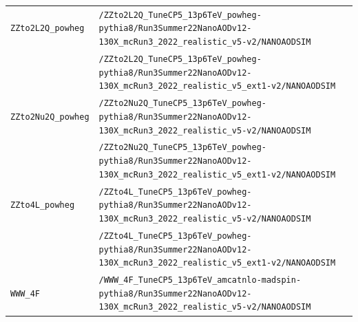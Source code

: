 \begin{longtable}{@{}>{\RaggedRight\arraybackslash}p{} >{\RaggedRight\arraybackslash}p{}@{}}
\addlinespace[2pt]
\texttt{ZZto2L2Q\_\allowbreak{}powheg} & \texttt{/\allowbreak{}ZZto2L2Q\_\allowbreak{}TuneCP5\_\allowbreak{}13p6TeV\_\allowbreak{}powheg-\allowbreak{}pythia8/\allowbreak{}Run3Summer22NanoAODv12-\allowbreak{}130X\_\allowbreak{}mcRun3\_\allowbreak{}2022\_\allowbreak{}realistic\_\allowbreak{}v5-\allowbreak{}v2/\allowbreak{}NANOAODSIM} \\
 & \texttt{/\allowbreak{}ZZto2L2Q\_\allowbreak{}TuneCP5\_\allowbreak{}13p6TeV\_\allowbreak{}powheg-\allowbreak{}pythia8/\allowbreak{}Run3Summer22NanoAODv12-\allowbreak{}130X\_\allowbreak{}mcRun3\_\allowbreak{}2022\_\allowbreak{}realistic\_\allowbreak{}v5\_\allowbreak{}ext1-\allowbreak{}v2/\allowbreak{}NANOAODSIM} \\
\addlinespace[2pt]
\texttt{ZZto2Nu2Q\_\allowbreak{}powheg} & \texttt{/\allowbreak{}ZZto2Nu2Q\_\allowbreak{}TuneCP5\_\allowbreak{}13p6TeV\_\allowbreak{}powheg-\allowbreak{}pythia8/\allowbreak{}Run3Summer22NanoAODv12-\allowbreak{}130X\_\allowbreak{}mcRun3\_\allowbreak{}2022\_\allowbreak{}realistic\_\allowbreak{}v5-\allowbreak{}v2/\allowbreak{}NANOAODSIM} \\
 & \texttt{/\allowbreak{}ZZto2Nu2Q\_\allowbreak{}TuneCP5\_\allowbreak{}13p6TeV\_\allowbreak{}powheg-\allowbreak{}pythia8/\allowbreak{}Run3Summer22NanoAODv12-\allowbreak{}130X\_\allowbreak{}mcRun3\_\allowbreak{}2022\_\allowbreak{}realistic\_\allowbreak{}v5\_\allowbreak{}ext1-\allowbreak{}v2/\allowbreak{}NANOAODSIM} \\
\addlinespace[2pt]
\texttt{ZZto4L\_\allowbreak{}powheg} & \texttt{/\allowbreak{}ZZto4L\_\allowbreak{}TuneCP5\_\allowbreak{}13p6TeV\_\allowbreak{}powheg-\allowbreak{}pythia8/\allowbreak{}Run3Summer22NanoAODv12-\allowbreak{}130X\_\allowbreak{}mcRun3\_\allowbreak{}2022\_\allowbreak{}realistic\_\allowbreak{}v5-\allowbreak{}v2/\allowbreak{}NANOAODSIM} \\
 & \texttt{/\allowbreak{}ZZto4L\_\allowbreak{}TuneCP5\_\allowbreak{}13p6TeV\_\allowbreak{}powheg-\allowbreak{}pythia8/\allowbreak{}Run3Summer22NanoAODv12-\allowbreak{}130X\_\allowbreak{}mcRun3\_\allowbreak{}2022\_\allowbreak{}realistic\_\allowbreak{}v5\_\allowbreak{}ext1-\allowbreak{}v2/\allowbreak{}NANOAODSIM} \\
\addlinespace[2pt]
\texttt{WWW\_\allowbreak{}4F} & \texttt{/\allowbreak{}WWW\_\allowbreak{}4F\_\allowbreak{}TuneCP5\_\allowbreak{}13p6TeV\_\allowbreak{}amcatnlo-\allowbreak{}madspin-\allowbreak{}pythia8/\allowbreak{}Run3Summer22NanoAODv12-\allowbreak{}130X\_\allowbreak{}mcRun3\_\allowbreak{}2022\_\allowbreak{}realistic\_\allowbreak{}v5-\allowbreak{}v2/\allowbreak{}NANOAODSIM} \\

\end{longtable}
